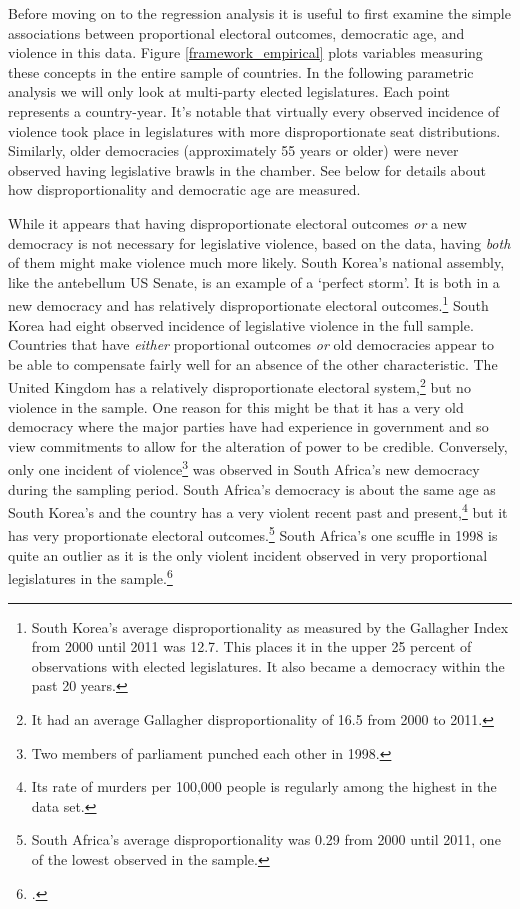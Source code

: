 \documentclass[a4paper]{article}\usepackage[]{graphicx}\usepackage[]{color}
\begin{document}
Before moving on to the regression analysis it is useful to first examine the simple associations between proportional electoral outcomes, democratic age, and violence in this data. Figure \ref{framework_empirical} plots variables measuring these concepts in the entire sample of countries. In the following parametric analysis we will only look at multi-party elected legislatures. Each point represents a country-year. It's notable that virtually every observed incidence of violence took place in legislatures with more disproportionate seat distributions. Similarly, older democracies (approximately 55 years or older) were never observed having legislative brawls in the chamber. See below for details about how disproportionality and democratic age are measured.

While it appears that having disproportionate electoral outcomes \emph{or} a new democracy is not necessary for legislative violence, based on the data, having \emph{both} of them might make violence much more likely. South Korea's national assembly, like the antebellum US Senate, is an example of a `perfect storm'. It is both in a new democracy and has relatively disproportionate electoral outcomes.\footnote{South Korea’s average disproportionality as measured by the Gallagher Index \citep{Gallagher1991} from 2000 until 2011 was 12.7. This places it in the upper 25 percent of observations with elected legislatures. It also became a democracy within the past 20 years.} South Korea had eight observed incidence of legislative violence in the full sample. Countries that have \emph{either} proportional outcomes \emph{or} old democracies appear to be able to compensate fairly well for an absence of the other characteristic. The United Kingdom has a relatively disproportionate electoral system,\footnote{It had an average Gallagher disproportionality of 16.5 from 2000 to 2011.} but no violence in the sample. One reason for this might be that it has a very old democracy where the major parties have had experience in government and so view commitments to allow for the alteration of power to be credible. Conversely, only one incident of violence\footnote{Two members of parliament punched each other in 1998.} was observed in South Africa's new democracy during the sampling period. South Africa's democracy is about the same age as South Korea's and the country has a very violent recent past and present,\footnote{Its rate of murders per 100,000 people is regularly among the highest in the \cite{UNMurder2013} data set.} but it has very proportionate electoral outcomes.\footnote{South Africa’s average disproportionality was 0.29 from 2000 until 2011, one of the lowest observed in the sample.} South Africa's one scuffle in 1998 is quite an outlier as it is the only violent incident observed in very proportional legislatures in the sample.\footnote{ \citep{Guardian2015}. }
\end{document}
